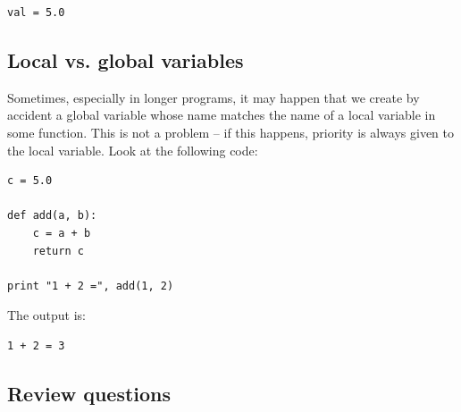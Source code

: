 \documentclass[article,A4,12pt]{llncs}
\begin{document}
\begin{verbatim}
val = 5.0
\end{verbatim}

\subsection{Local vs. global variables}

Sometimes, especially in longer programs, it may happen that we create by accident a global variable 
whose name matches the name of a local variable in some function. This is not a problem
-- if this happens, priority is always given to the local variable. Look at the 
following code:

\begin{verbatim}
c = 5.0

def add(a, b):
    c = a + b
    return c

print "1 + 2 =", add(1, 2)
\end{verbatim}
The output is:

\begin{verbatim}
1 + 2 = 3
\end{verbatim}

\subsection{Review questions}
\end{document}
